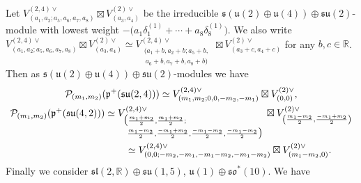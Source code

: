 \documentclass[pdftex]{sigma}
\numberwithin{equation}{section}
\newcommand{\BR}{\mathbb{R}}
\newcommand{\fp}{\mathfrak{p}}
\newcommand{\cP}{\mathcal{P}}
\begin{document}
Let $V_{(a_1,a_2;a_5,a_6,a_7,a_8)}^{(2,4)\vee}\boxtimes V_{(a_3,a_4)}^{(2)\vee}$ be the irreducible
$\mathfrak{s}(\mathfrak{u}(2)\oplus\mathfrak{u}(4))\oplus\mathfrak{su}(2)$-module with lowest weight
$-\big(a_1\delta_1^{(1)}+\cdots+a_8\delta_8^{(1)}\big)$.
We also write $V_{(a_1,a_2;a_5,a_6,a_7,a_8)}^{(2,4)\vee}\boxtimes V_{(a_3,a_4)}^{(2)\vee}
\simeq V_{\substack{(a_1+b,a_2+b;a_5+b,\ \\ \ a_6+b,a_7+b,a_8+b)}}^{(2,4)\vee}\boxtimes V_{(a_3+c,a_4+c)}^{(2)\vee}$ for any $b,c\in\BR$.
Then as $\mathfrak{s}(\mathfrak{u}(2)\oplus\mathfrak{u}(4))\oplus\mathfrak{su}(2)$-modules we have
\begin{gather*}
\cP_{(m_1,m_2)}(\fp^+(\mathfrak{su}(2,4))) \simeq V_{(m_1,m_2;0,0,-m_2,-m_1)}^{(2,4)\vee}\boxtimes V_{(0,0)}^{(2)\vee},\\
\cP_{(m_1,m_2)}(\fp^+(\mathfrak{su}(4,2))) \simeq
V_{\substack{\bigl(\frac{m_1+m_2}{2},\frac{m_1+m_2}{2};\hspace{80pt}\\
\; \frac{m_1-m_2}{2},\frac{-m_1+m_2}{2},\frac{-m_1-m_2}{2},\frac{-m_1-m_2}{2}\bigr)}}^{(2,4)\vee}
\boxtimes V_{\left(\frac{m_1-m_2}{2},\frac{-m_1+m_2}{2}\right)}^{(2)\vee}\\
\hphantom{\cP_{(m_1,m_2)}(\fp^+(\mathfrak{su}(4,2)))}{} \simeq V_{(0,0;-m_2,-m_1,-m_1-m_2,-m_1-m_2)}^{(2,4)\vee}\boxtimes V_{(m_1-m_2,0)}^{(2)\vee}.
\end{gather*}
Finally we consider $\mathfrak{sl}(2,\BR)\oplus\mathfrak{su}(1,5)$, $\mathfrak{u}(1)\oplus\mathfrak{so}^*(10)$. We have
\end{document}
